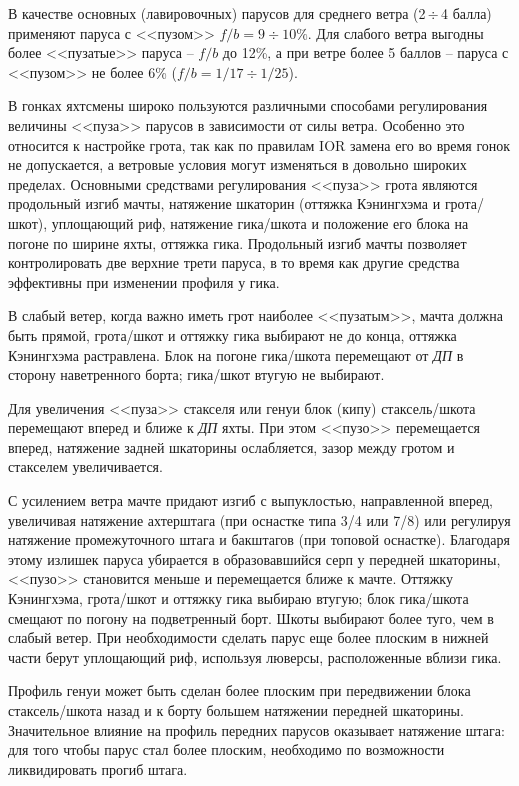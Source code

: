 \documentclass[a4paper, 12pt, twoside, final, book, russian, fittopage, cyremdash]{ncc}
\newcommand{\otdo}{\,\ensuremath{\div}\,}
\newcommand{\motdo}{\div}
\begin{document}
В качестве основных (лавировочных) парусов для среднего ветра (2\otdo 4 балла) применяют паруса с <<пузом>> $f/b=9\motdo 10\%$. Для слабого ветра выгодны более <<пузатые>> паруса \--- $f/b$ до 12\%, а при ветре более 5 баллов \--- паруса с <<пузом>> не более 6\% ($f/b=1/17\motdo 1/25$). 

В гонках яхтсмены широко пользуются различными способами регулирования величины <<пуза>> парусов в зависимости от силы ветра. Особенно это относится к настройке грота, так как по правилам IOR замена его во время гонок не допускается, а ветровые условия могут изменяться в довольно широких пределах. Основными средствами регулирования <<пуза>> грота являются продольный изгиб мачты, натяжение шкаторин (оттяжка Кэнингхэма и грота\-/шкот), уплощающий риф, натяжение гика\-/шкота и положение его блока на погоне по ширине яхты, оттяжка гика. Продольный изгиб мачты позволяет контролировать две верхние трети паруса, в то время как другие средства эффективны при изменении профиля у гика.

В слабый ветер, когда важно иметь грот наиболее <<пузатым>>, мачта должна быть прямой, грота\-/шкот и оттяжку гика выбирают не до конца, оттяжка Кэнингхэма растравлена. Блок на погоне гика\-/шкота перемещают от \textit{ДП} в сторону наветренного борта; гика\-/шкот втугую не выбирают.

Для увеличения <<пуза>> стакселя или генуи блок (кипу) стаксель\-/шкота перемещают вперед и ближе к \textit{ДП} яхты. При этом <<пузо>> перемещается вперед, натяжение задней шкаторины ослабляется, зазор между гротом и стакселем увеличивается. 

С усилением ветра мачте придают изгиб с выпуклостью, направленной вперед, увеличивая натяжение ахтерштага (при оснастке типа 3/4 или 7/8) или регулируя натяжение промежуточного штага и бакштагов (при топовой оснастке). Благодаря этому излишек паруса убирается в образовавшийся серп у передней шкаторины, <<пузо>> становится меньше и перемещается ближе к мачте. Оттяжку Кэнингхэма, грота\-/шкот и оттяжку гика выбираю втугую; блок гика\-/шкота смещают по погону на подветренный борт. Шкоты выбирают более туго, чем в слабый ветер. При необходимости сделать парус еще более плоским в нижней части берут уплощающий риф, используя люверсы, расположенные вблизи гика.

Профиль генуи может быть сделан более плоским при передвижении блока стаксель\-/шкота назад и к борту большем натяжении передней шкаторины. Значительное влияние на профиль передних парусов оказывает натяжение штага: для того чтобы парус стал более плоским, необходимо по возможности ликвидировать прогиб штага.
\end{document}
